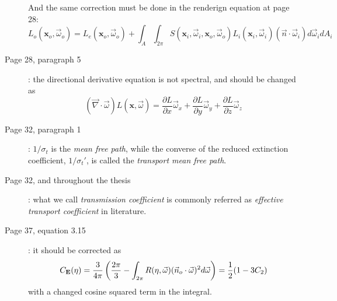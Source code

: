\documentclass[12pt, twoside,a4paper]{article}
\newcommand{\vomega}{\vec{\omega}}
\newcommand{\x}{\mathbf{x}}
\newcommand{\ce}{C_{\mathbf{E}}(\eta)}
\begin{document}
\begin{description}
$$$$
And the same correction must be done in the renderign equation at page 28:
$$
L_o(\x_o,\vomega_o) = L_e(\x_o,\vomega_o) + \int_A \int_{2\pi} S(\x_i, \vomega_i, \x_o, \vomega_o) L_i(\x_i,\vomega_i) (\vec{n} \cdot \vomega_i) d\vomega_i d A_i
$$
\item [Page 28, paragraph 5]: the directional derivative equation is not spectral, and should be changed as
$$
(\vec{\nabla} \cdot \vomega) L(\x, \vomega) = \frac{\partial L}{\partial x} \vomega_x + \frac{\partial L}{\partial y} \vomega_y + \frac{\partial L}{\partial z} \vomega_z
$$
\item [Page 32, paragraph 1]:  $1/\sigma_t$ is the \emph{mean free path}, while the converse of the reduced extinction coefficient, $1/\sigma_t'$, is called the \emph{transport mean free path}.
\item [Page 32, and throughout the thesis]: what we call \emph{transmission coefficient} is commonly referred as \emph{effective transport coefficient} in literature.
\item [Page 37, equation 3.15]: it should be corrected as
$$
\ce = \frac{3}{4\pi} \left(\frac{2\pi}{3} - \int_{2\pi} R(\eta,\vomega) (\vec{n}_o \cdot \vomega)^2 d \vomega \right) = \frac{1}{2}(1 - 3 C_2) \\
$$
with a changed cosine squared term in the integral.
\end{description}
\end{document}

